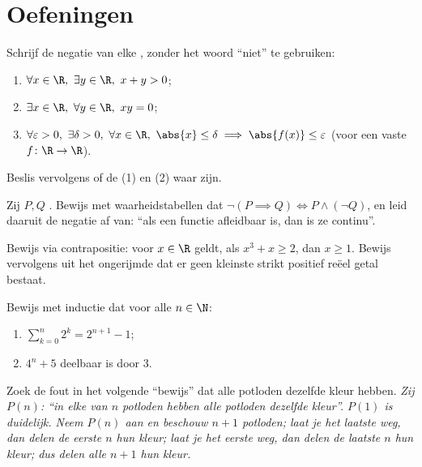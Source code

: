 \section{Oefeningen}

\begin{exercise}[$\star$]\label{exo:b1:logic:1}
Schrijf de negatie van elke , zonder het woord ``niet'' te
gebruiken:
\begin{enumerate}
  \item $\forall x \in \R,\ \exists y \in \R,\ x + y > 0$;
  \item $\exists x \in \R,\ \forall y \in \R,\ xy = 0$;
  \item $\forall \varepsilon > 0,\ \exists \delta > 0,\ \forall x \in
        \R,\ \abs{x} \leq \delta \implies \abs{f(x)} \leq \varepsilon$
        (voor een vaste  $f \colon \R \to \R$).
\end{enumerate}
Beslis vervolgens of de  (1) en (2) waar zijn.
\end{exercise}

\begin{exercise}[$\star$]\label{exo:b1:logic:2}
Zij $P, Q$ . Bewijs met waarheidstabellen dat $\lnot(P
\implies Q) \iff P \land (\lnot Q)$, en leid daaruit de negatie af van:
``als een functie afleidbaar is, dan is ze continu''.
\end{exercise}

\begin{exercise}[$\star$]\label{exo:b1:logic:3}
Bewijs via contrapositie: voor $x \in \R$ geldt, als $x^3 + x \geq 2$,
dan $x \geq 1$. Bewijs vervolgens uit het ongerijmde dat er geen kleinste
strikt positief reëel getal bestaat.
\end{exercise}

\begin{exercise}[$\star$]\label{exo:b1:logic:4}
Bewijs met inductie dat voor alle $n \in \N$:
\begin{enumerate}
  \item $\sum_{k=0}^{n} 2^k = 2^{n+1} - 1$;
  \item $4^n + 5$ deelbaar is door $3$.
\end{enumerate}
\end{exercise}

\begin{exercise}[$\star$]\label{exo:b1:logic:5}
Zoek de fout in het volgende ``bewijs'' dat alle potloden dezelfde kleur
hebben. \emph{Zij $P(n)$: ``in elke  van $n$ potloden hebben
alle potloden dezelfde kleur''. $P(1)$ is duidelijk. Neem $P(n)$ aan en
beschouw $n+1$ potloden; laat je het laatste weg, dan delen de eerste $n$
hun kleur; laat je het eerste weg, dan delen de laatste $n$ hun kleur;
dus delen alle $n+1$ hun kleur.}
\end{exercise}

